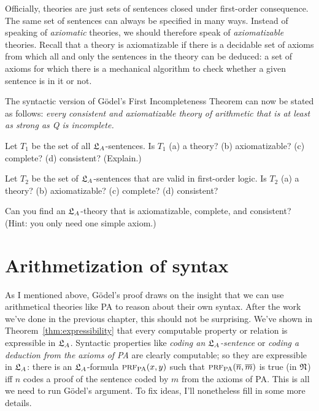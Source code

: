 Officially,
theories are just sets of sentences closed under first-order consequence.
The same set of sentences can always be specified in many ways.
Instead of speaking of \emph{axiomatic} theories,
we should therefore speak of \emph{axiomatizable} theories.
Recall that a theory is axiomatizable if
there is a decidable set of axioms
from which all and only the sentences in the theory can be deduced:
a set of axioms for which
there is a mechanical algorithm to check whether a given sentence is in it or not.

The syntactic version of Gödel's First Incompleteness Theorem can now be stated as follows:
\emph{every consistent and axiomatizable theory of arithmetic that is at least as strong as Q is incomplete.}

\begin{exercise}
  Let $T_1$ be the set of all $\mathfrak{L}_A$-sentences.
  Is $T_1$ (a) a theory? (b) axiomatizable? (c) complete? (d) consistent? (Explain.)
\end{exercise}

\begin{exercise}
  Let $T_2$ be the set of $\mathfrak{L}_A$-sentences that are valid in first-order logic.
  Is $T_2$ (a) a theory? (b) axiomatizable? (c) complete? (d) consistent?
\end{exercise}

\begin{exercise}
  Can you find an $\mathfrak{L}_A$-theory that is axiomatizable, complete, and consistent?
  (Hint: you only need one simple axiom.)
\end{exercise}


\section{Arithmetization of syntax}\label{sec:arithmetization}

As I mentioned above,
Gödel's proof draws on the insight that
we can use arithmetical theories like PA to reason about their own syntax.
After the work we've done in the previous chapter,
this should not be surprising.
We've shown in Theorem~\ref{thm:expressibility} that
every computable property or relation is expressible in $\mathfrak{L}_A$.
Syntactic properties like
\emph{coding an $\mathfrak{L}_A$-sentence} or \emph{coding a deduction from the axioms of PA}
are clearly computable;
so they are expressible in $\mathfrak{L}_A$:
there is an $\mathfrak{L}_A$-formula $\smallcaps{Prf}_{\mathrm{PA}}(x,y)$
such that $\smallcaps{Prf}_{\mathrm{PA}}(\num{n},\num{m})$ is true (in $\mathfrak{N}$) iff
$n$ codes a proof of the sentence coded by $m$ from the axioms of PA.
This is all we need to run Gödel's argument.
To fix ideas,
I'll nonetheless fill in some more details.

